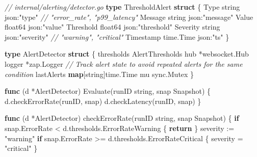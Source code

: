 \documentclass[
]{article}
\newenvironment{Shaded}{}{}
\newcommand{\CommentTok}[1]{\textcolor[rgb]{0.38,0.63,0.69}{\textit{#1}}}
\newcommand{\ControlFlowTok}[1]{\textcolor[rgb]{0.00,0.44,0.13}{\textbf{#1}}}
\newcommand{\DataTypeTok}[1]{\textcolor[rgb]{0.56,0.13,0.00}{#1}}
\newcommand{\KeywordTok}[1]{\textcolor[rgb]{0.00,0.44,0.13}{\textbf{#1}}}
\newcommand{\NormalTok}[1]{#1}
\newcommand{\OperatorTok}[1]{\textcolor[rgb]{0.40,0.40,0.40}{#1}}
\newcommand{\StringTok}[1]{\textcolor[rgb]{0.25,0.44,0.63}{#1}}
\begin{document}
\begin{Shaded}
\begin{Highlighting}[]
\CommentTok{// internal/alerting/detector.go}
\KeywordTok{type}\NormalTok{ ThresholdAlert }\KeywordTok{struct} \OperatorTok{\{}
\NormalTok{    Type      }\DataTypeTok{string}    \StringTok{\textasciigrave{}json:"type"\textasciigrave{}}      \CommentTok{// "error\_rate", "p99\_latency"}
\NormalTok{    Message   }\DataTypeTok{string}    \StringTok{\textasciigrave{}json:"message"\textasciigrave{}}
\NormalTok{    Value     }\DataTypeTok{float64}   \StringTok{\textasciigrave{}json:"value"\textasciigrave{}}
\NormalTok{    Threshold }\DataTypeTok{float64}   \StringTok{\textasciigrave{}json:"threshold"\textasciigrave{}}
\NormalTok{    Severity  }\DataTypeTok{string}    \StringTok{\textasciigrave{}json:"severity"\textasciigrave{}}  \CommentTok{// "warning", "critical"}
\NormalTok{    Timestamp time}\OperatorTok{.}\NormalTok{Time }\StringTok{\textasciigrave{}json:"ts"\textasciigrave{}}
\OperatorTok{\}}

\KeywordTok{type}\NormalTok{ AlertDetector }\KeywordTok{struct} \OperatorTok{\{}
\NormalTok{    thresholds AlertThresholds}
\NormalTok{    hub        }\OperatorTok{*}\NormalTok{websocket}\OperatorTok{.}\NormalTok{Hub}
\NormalTok{    logger     }\OperatorTok{*}\NormalTok{zap}\OperatorTok{.}\NormalTok{Logger}
    \CommentTok{// Track alert state to avoid repeated alerts for the same condition}
\NormalTok{    lastAlerts }\KeywordTok{map}\OperatorTok{[}\DataTypeTok{string}\OperatorTok{]}\NormalTok{time}\OperatorTok{.}\NormalTok{Time}
\NormalTok{    mu         sync}\OperatorTok{.}\NormalTok{Mutex}
\OperatorTok{\}}

\KeywordTok{func} \OperatorTok{(}\NormalTok{d }\OperatorTok{*}\NormalTok{AlertDetector}\OperatorTok{)}\NormalTok{ Evaluate}\OperatorTok{(}\NormalTok{runID }\DataTypeTok{string}\OperatorTok{,}\NormalTok{ snap Snapshot}\OperatorTok{)} \OperatorTok{\{}
\NormalTok{    d}\OperatorTok{.}\NormalTok{checkErrorRate}\OperatorTok{(}\NormalTok{runID}\OperatorTok{,}\NormalTok{ snap}\OperatorTok{)}
\NormalTok{    d}\OperatorTok{.}\NormalTok{checkLatency}\OperatorTok{(}\NormalTok{runID}\OperatorTok{,}\NormalTok{ snap}\OperatorTok{)}
\OperatorTok{\}}

\KeywordTok{func} \OperatorTok{(}\NormalTok{d }\OperatorTok{*}\NormalTok{AlertDetector}\OperatorTok{)}\NormalTok{ checkErrorRate}\OperatorTok{(}\NormalTok{runID }\DataTypeTok{string}\OperatorTok{,}\NormalTok{ snap Snapshot}\OperatorTok{)} \OperatorTok{\{}
    \ControlFlowTok{if}\NormalTok{ snap}\OperatorTok{.}\NormalTok{ErrorRate }\OperatorTok{\textless{}}\NormalTok{ d}\OperatorTok{.}\NormalTok{thresholds}\OperatorTok{.}\NormalTok{ErrorRateWarning }\OperatorTok{\{}
        \ControlFlowTok{return}
    \OperatorTok{\}}
\NormalTok{    severity }\OperatorTok{:=} \StringTok{"warning"}
    \ControlFlowTok{if}\NormalTok{ snap}\OperatorTok{.}\NormalTok{ErrorRate }\OperatorTok{\textgreater{}=}\NormalTok{ d}\OperatorTok{.}\NormalTok{thresholds}\OperatorTok{.}\NormalTok{ErrorRateCritical }\OperatorTok{\{}
\NormalTok{        severity }\OperatorTok{=} \StringTok{"critical"}
    \OperatorTok{\}}


\end{Highlighting}
\end{Shaded}
\end{document}

